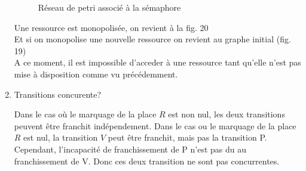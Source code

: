 \begin{enumerate}
\begin{figure}[H]
  \caption{Réseau de petri associé à la sémaphore} \label{fig:M1}
\end{figure}

Une ressource est monopolisée, on revient à la fig. 20\\
Et si on monopolise une nouvelle ressource on revient au graphe initial (fig. 19)\\
A ce moment, il est impossible d'acceder à une ressource tant qu'elle n'est pas mise à disposition comme vu précédemment.

\item Transitions concurente?

Dans le cas où le marquage de la place $R$ est non nul, les deux transitions peuvent être franchit indépendement.
Dans le cas ou le marquage de la place $R$ est nul, la transition $V$ peut être franchit, mais pas la transition P.
Cependant, l'incapacité de franchissement de P n'est pas du au franchissement de V.
Donc ces deux transition ne sont pas concurrentes.


\end{enumerate}


